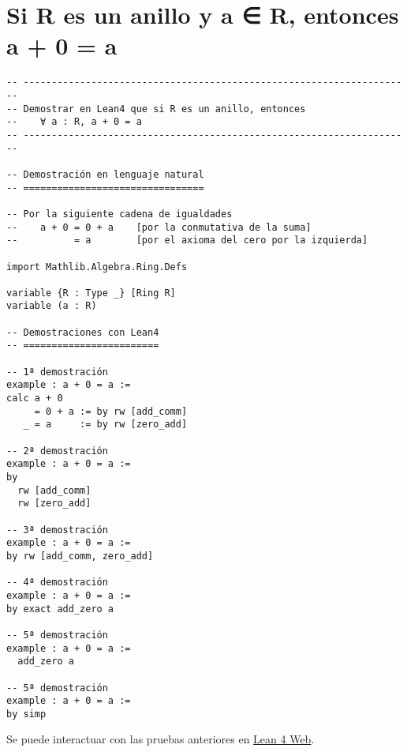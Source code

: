 \section{Si R es un anillo y a ∈ R, entonces a + 0 = a}
\label{sec:org8dbdd90}
\begin{verbatim}
-- ---------------------------------------------------------------------
-- Demostrar en Lean4 que si R es un anillo, entonces
--    ∀ a : R, a + 0 = a
-- ---------------------------------------------------------------------

-- Demostración en lenguaje natural
-- ================================

-- Por la siguiente cadena de igualdades
--    a + 0 = 0 + a    [por la conmutativa de la suma]
--          = a        [por el axioma del cero por la izquierda]

import Mathlib.Algebra.Ring.Defs

variable {R : Type _} [Ring R]
variable (a : R)

-- Demostraciones con Lean4
-- ========================

-- 1ª demostración
example : a + 0 = a :=
calc a + 0
     = 0 + a := by rw [add_comm]
   _ = a     := by rw [zero_add]

-- 2ª demostración
example : a + 0 = a :=
by
  rw [add_comm]
  rw [zero_add]

-- 3ª demostración
example : a + 0 = a :=
by rw [add_comm, zero_add]

-- 4ª demostración
example : a + 0 = a :=
by exact add_zero a

-- 5ª demostración
example : a + 0 = a :=
  add_zero a

-- 5ª demostración
example : a + 0 = a :=
by simp
\end{verbatim}
Se puede interactuar con las pruebas anteriores en \href{https://lean.math.hhu.de/\#url=https://raw.githubusercontent.com/jaalonso/Calculemus2/main/src/Suma\_con\_cero.lean}{Lean 4 Web}.

